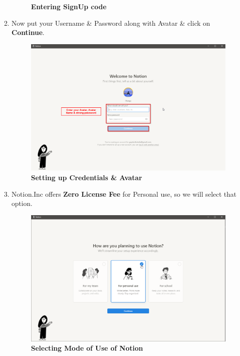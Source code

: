 \begin{enumerate}
\begin{figure}[h]
        \caption{\textbf{Entering SignUp code}}
        \label{fig: Sign_up_Code}
        \end{figure} \newpage
    \item Now put your Username \& Password along with Avatar \& click on \textbf{Continue}.
        \begin{figure}[h]
        \centering
        \includegraphics[scale=0.4]{gfx/10.png}
        \caption{\textbf{Setting up Credentials \& Avatar}}
        \label{fig_Sign_up_Notion}
        \end{figure}
\newpage
    \item Notion.Inc offers \textbf{Zero License Fee} for Personal use, so we will select that option. 
        \begin{figure}[h]
        \centering
        \includegraphics[scale=0.4]{gfx/11.png}
        \caption{\textbf{Selecting Mode of Use of Notion}}
        \label{fig_Sign_up_Notion}
        \end{figure} 

\end{enumerate}
